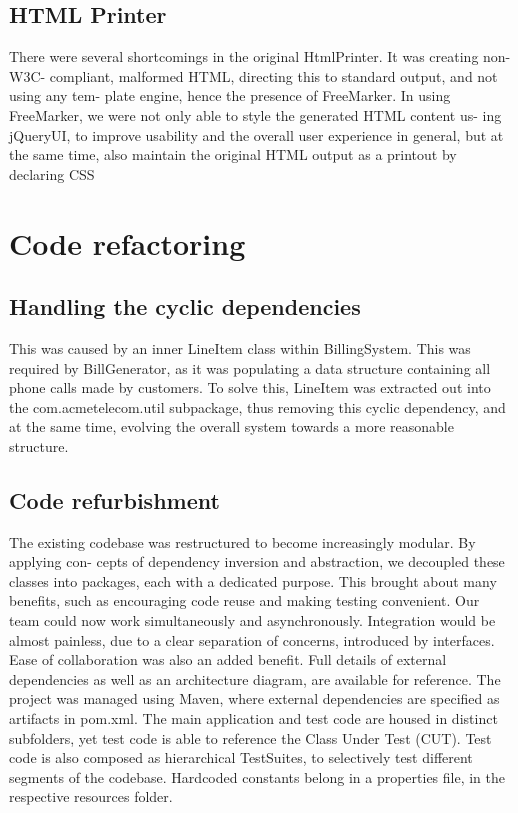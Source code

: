 \documentclass[11pt,twocolumn]{article} %
\begin{document}
\subsection{HTML Printer}
There were several shortcomings in the original HtmlPrinter. It was creating non-W3C-
compliant, malformed HTML, directing this to standard output, and not using any tem-
plate engine, hence the presence of FreeMarker.
In using FreeMarker, we were not only able to style the generated HTML content us-
ing jQueryUI, to improve usability and the overall user experience in general, but at
the same time, also maintain the original HTML output as a printout by declaring CSS


\section{Code refactoring}

\subsection{Handling the cyclic dependencies}
This was caused by an inner LineItem class within BillingSystem. This was required by
BillGenerator, as it was populating a data structure containing all phone calls made by
customers.
To solve this, LineItem was extracted out into the com.acmetelecom.util subpackage,
thus removing this cyclic dependency, and at the same time, evolving the overall system
towards a more reasonable structure.

\subsection{Code refurbishment}
The existing codebase was restructured to become increasingly modular. By applying con-
cepts of dependency inversion and abstraction, we decoupled these classes into packages,
each with a dedicated purpose.
This brought about many benefits, such as encouraging code reuse and making testing
convenient. Our team could now work simultaneously and asynchronously. Integration
would be almost painless, due to a clear separation of concerns, introduced by interfaces.
Ease of collaboration was also an added benefit.
Full details of external dependencies as well as an architecture diagram, are available for reference.
The project was managed using Maven, where external dependencies are specified as
artifacts in pom.xml. The main application and test code are housed in distinct subfolders,
yet test code is able to reference the Class Under Test (CUT). Test code is also composed
as hierarchical TestSuites, to selectively test different segments of the codebase. Hardcoded
constants belong in a properties file, in the respective resources folder.
\end{document}
